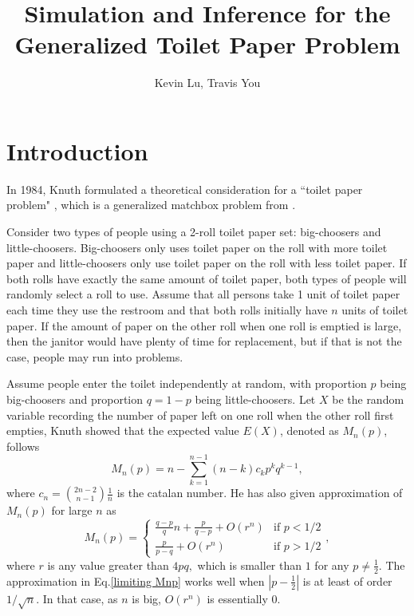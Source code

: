 \documentclass{article}
\author{Kevin Lu, Travis You}
\title{Simulation and Inference for the Generalized Toilet Paper Problem}
\begin{document}
\maketitle
\section{Introduction}
In 1984, Knuth formulated a theoretical consideration for a ``toilet paper problem" \cite{Knuth1984}, which is a generalized matchbox problem from \cite{Feller}. 

Consider two types of people using a 2-roll toilet paper set: big-choosers and little-choosers. Big-choosers only uses toilet paper on the roll with more toilet paper and little-choosers only use toilet paper on the roll with less toilet paper. If both rolls have exactly the same amount of toilet paper, both types of people will randomly select a roll to use. Assume that all persons take 1 unit of toilet paper each time they use the restroom and that both rolls initially have $n$ units of toilet paper. If the amount of paper on the other roll when one roll is emptied is large, then the janitor would have plenty of time for replacement, but if that is not the case, people may run into problems.

Assume people enter the toilet independently at random, with proportion $p$ being big-choosers and proportion $q=1-p$ being little-choosers. Let $X$ be the random variable recording the number of paper left on one roll when the other roll first empties, Knuth showed that the expected value $E(X)$, denoted as $M_n(p)$, follows
\begin{equation}
    M_n(p) = n-\sum_{k=1}^{n-1} (n-k)c_k p^k q^{k-1}, 
\end{equation}
where $c_n = \binom{2n-2}{n-1}\frac{1}{n}$ is the catalan number. He has also given approximation of $M_n(p)$ for large $n$ as 
\begin{equation}
    M_n(p)=
    \begin{cases}
        \frac{q-p}{q}n+\frac{p}{q-p}+O(r^n) & \text{if }  p<1/2 \\
        \frac{p}{p-q} + O(r^n) & \text{if } p>1/2
    \end{cases}
    ,
    \label{limiting Mnp}
\end{equation}
where $r$ is any value greater than $4pq,$ which is smaller than $1$ for any $p \neq \frac{1}{2}$. The approximation in Eq.\eqref{limiting Mnp} works well when $|p-\frac{1}{2}|$ is at least of order $1/\sqrt{n}$. In that case, as $n$ is big, $O(r^n)$ is essentially 0. 
\end{document}
